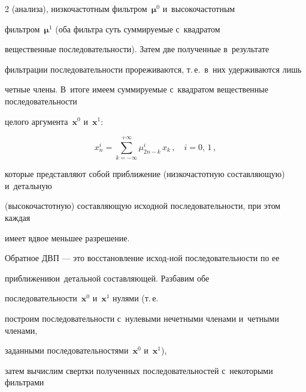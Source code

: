 \begin{multicols}{2}
(анализа), низкочастотным фильтром~${\boldsymbol\mu}^0$ и~высокочастотным 

фильтром~${\boldsymbol\mu}^1$  (оба фильтра суть сум\-мируемые с~квадратом 

вещественные последовательности). Затем две полученные в~результате 

фильт\-ра\-ции последовательности прореживаются, т.\,е.\ в~них удерживаются лишь 

четные члены. В~итоге имеем суммируемые с~квадратом вещественные последовательности 

целого аргумента~$\mathbf{x}^{0}$ и~$\mathbf{x}^{1}$:



\vspace*{2pt}



\noindent

\begin{equation}

\label{eq34}

x_n^i=\sum\limits_{k=-\infty}^{+\infty} \mu_{2n-k}^{i}\,x_k\,, \quad i=0,\,1\,,

\end{equation}



\vspace*{-2pt}



\noindent

которые представляют собой приближение (низкочастотную составляющую) и~детальную 

(высокочастотную) составляющую исходной последовательности, при этом каждая 

имеет вдвое меньшее разрешение.



Обратное ДВП --- это восстановление исход-\linebreak ной последовательности по ее 

приближению\linebreak и~детальной составляющей. Разбавим обе 

по\-сле\-до\-ва\-тель\-ности~$\mathbf{x}^{0}$ и~$\mathbf{x}^{1}$ нулями (т.\,е.\ 

построим последовательности с~нулевыми нечетными членами и~четными членами, 

заданными последовательностями~$\mathbf{x}^{0}$ и~$\mathbf{x}^{1}$), 

затем вычислим свертки полученных последовательностей с~некоторыми фильтрами 


\end{multicols}
